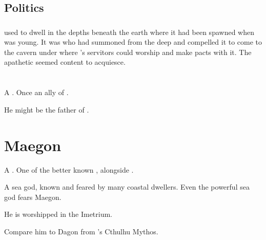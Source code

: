 \subsection{Politics}





\subsubsection{\Ubloth}
 used to dwell in the depths beneath the earth where it had been spawned when \Miith was young. 
It was \Ishtacca who had summoned \Ubloth from the deep and compelled it to come to the cavern under \Yormis where \Ishtacca's servitors could worship \Ubloth and make pacts with it. 
The apathetic  seemed content to acquiesce.
















\section{\Iurzmacul}
\index{\Iurzmacul}
A \nagalord. 
Once an ally of \TyarithXserasshana. 

He might be the father of .



















\section{Maegon}
A \nagalord. 
One of the better known \nagalords, alongside . 

A sea god, known and feared by many coastal dwellers. 
Even the powerful sea god  fears Maegon. 

He is worshipped in the Imetrium. 

Compare him to Dagon from \HPLovecraft's Cthulhu Mythos. 















